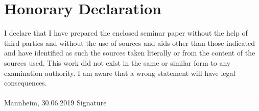 ﻿\documentclass[11pt,titlepage,oneside,openany]{book}
\begin{document}



\appendix

\newpage

\pagestyle{empty}

\section*{Honorary Declaration}
I declare that I have prepared the enclosed seminar paper without the help of third parties and without the use of sources and aids other than those indicated and have identified as such the sources taken literally or from the content of the sources used. This work did not exist in the same or similar form to any examination authority. I am aware that a wrong statement will have legal consequences.
\\
\\

\noindent
Mannheim, 30.06.2019 \hspace{4cm} Signature
\end{document}
